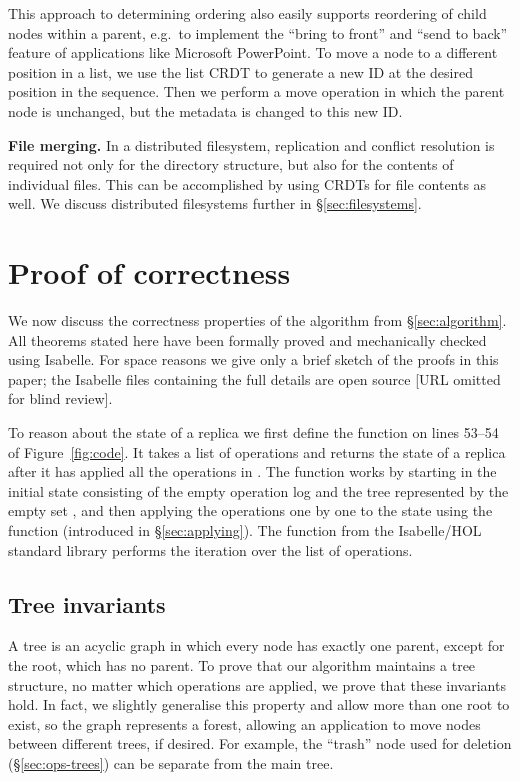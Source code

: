 \documentclass[sigplan,anonymous]{acmart}
\begin{document}
This approach to determining ordering also easily supports reordering of child nodes within a parent, e.g.\ to implement the ``bring to front'' and ``send to back'' feature of applications like Microsoft PowerPoint.
To move a node to a different position in a list, we use the list CRDT to generate a new ID at the desired position in the sequence.
Then we perform a move operation in which the parent node is unchanged, but the metadata is changed to this new ID.

\smallbreak\noindent\textbf{File merging.}
In a distributed filesystem, replication and conflict resolution is required not only for the directory structure, but also for the contents of individual files.
This can be accomplished by using CRDTs for file contents as well.
We discuss distributed filesystems further in \S\ref{sec:filesystems}.

\section{Proof of correctness}\label{sec:proof}

We now discuss the correctness properties of the algorithm from \S\ref{sec:algorithm}.
All theorems stated here have been formally proved and mechanically checked using Isabelle.
For space reasons we give only a brief sketch of the proofs in this paper; the Isabelle files containing the full details are open source [URL omitted for blind review].


To reason about the state of a replica we first define the function  on lines 53--54 of Figure~\ref{fig:code}.
It takes a list of operations  and returns the state of a replica after it has applied all the operations in .
The  function works by starting in the initial state \isa{([], \{\})} consisting of the empty operation log \isa{[]} and the tree represented by the empty set \isa{\{\}}, and then applying the operations one by one to the state using the  function (introduced in \S\ref{sec:applying}).
The  function from the Isabelle/HOL standard library performs the iteration over the list of operations.

\subsection{Tree invariants}\label{sec:tree-invariants}

A tree is an acyclic graph in which every node has exactly one parent, except for the root, which has no parent.
To prove that our algorithm maintains a tree structure, no matter which operations are applied, we prove that these invariants hold.
In fact, we slightly generalise this property and allow more than one root to exist, so the graph represents a forest, allowing an application to move nodes between different trees, if desired.
For example, the ``trash'' node used for deletion (\S\ref{sec:ops-trees}) can be separate from the main tree.
\end{document}
